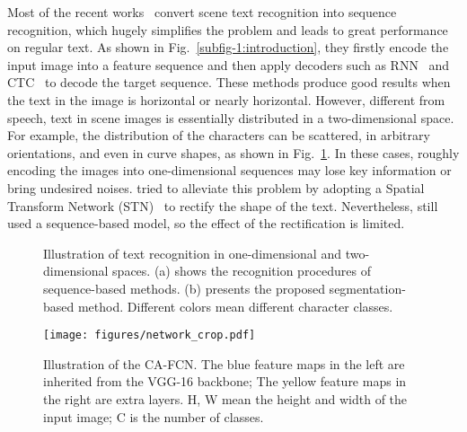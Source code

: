 \documentclass[letterpaper]{article} \usepackage{aaai19}  \usepackage{times}  \usepackage{helvet}  \usepackage{courier}  \usepackage{url}  \usepackage{graphicx}  \frenchspacing  \usepackage{multirow}
\begin{document}
Most of the recent works~\cite{DBLP:journals/pami/ShiBY17,DBLP:conf/cvpr/ShiWLYB16,zhu2016scene} convert scene text recognition into sequence recognition, which hugely simplifies the problem and leads to great performance on regular text. As shown in Fig.~\ref{subfig-1:introduction}, they firstly encode the input image into a feature sequence and then apply decoders such as RNN~\cite{hochreiter1997long} and CTC~\cite{ctc} to decode the target sequence. These methods produce good results when the text in the image is horizontal or nearly horizontal. However, different from speech, text in scene images is essentially distributed in a two-dimensional space. For example, the distribution of the characters can be scattered, in arbitrary orientations, and even in curve shapes, as shown in Fig.~\ref{fig:introduction}. In these cases, roughly encoding the images into one-dimensional sequences may lose key information or bring undesired noises. 
\cite{DBLP:conf/cvpr/ShiWLYB16} tried to alleviate this problem by adopting a Spatial Transform Network (STN)~\cite{stn} to rectify the shape of the text. Nevertheless, \cite{DBLP:conf/cvpr/ShiWLYB16} still used a sequence-based model, so the effect of the rectification is limited.

\begin{figure}[!htbp]
\begin{center}
\captionsetup[subfigure]{justification=centering}
    \centering
{}
\end{center}
\caption{Illustration of text recognition in one-dimensional and two-dimensional spaces. (a) shows the recognition procedures of sequence-based methods. (b) presents the proposed segmentation-based method. Different colors mean different character classes.}
\label{fig:introduction}
\end{figure}

\begin{figure*}[ht]
\centering
\texttt{[image: figures/network\_crop.pdf]}
\caption{Illustration of the CA-FCN. The blue feature maps in the left are inherited from the VGG-16 backbone; The yellow feature maps in the right are extra layers. H, W mean the height and width of the input image; C is the number of classes.}
\label{fig:network}
\end{figure*}
\end{document}
